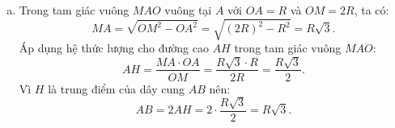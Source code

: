 \begin{bt}
{\begin{enumerate}[a)]
	Xét tam giác vuông $MAO$ vuông tại $A$ có đường cao $AH \perp MO$, áp dụng hệ thức lượng ta có:
	$$ OH \cdot OM = OA^2. $$
	Vì $AC$ là đường kính nên $AC = 2R \implies OA = R = \dfrac{AC}{2} \implies OA^2 = \dfrac{AC^2}{4}$.\\
	Do đó:
	$$ OH \cdot OM = \dfrac{AC^2}{4}. $$
	\item Trong tam giác vuông $MAO$ vuông tại $A$ với $OA = R$ và $OM = 2R$, ta có:
	$$ MA = \sqrt{OM^2 - OA^2} = \sqrt{(2R)^2 - R^2} = R\sqrt{3}. $$
	Áp dụng hệ thức lượng cho đường cao $AH$ trong tam giác vuông $MAO$:
	$$ AH = \dfrac{MA \cdot OA}{OM} = \dfrac{R\sqrt{3} \cdot R}{2R} = \dfrac{R\sqrt{3}}{2}. $$
	Vì $H$ là trung điểm của dây cung $AB$ nên:
	$$ AB = 2AH = 2 \cdot \dfrac{R\sqrt{3}}{2} = R\sqrt{3}. $$
\end{enumerate}
}
\end{bt}

